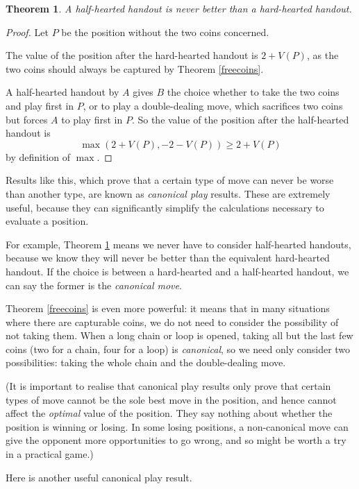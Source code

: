 \documentclass[a4paper,twocolumn]{article}
\newtheorem{halfheartedbad}[thm]{Theorem}
\begin{document}
\begin{halfheartedbad}\label{halfheartedbad}
  A half-hearted handout is never better than a hard-hearted handout.
\end{halfheartedbad}
\begin{proof}
  Let $P$ be the position without the two coins concerned.

  The value of the position after the hard-hearted handout is
  $2+V(P)$, as the two coins should always be captured by Theorem
  \ref{freecoins}.

  A half-hearted handout by $A$ gives $B$ the choice whether to take
  the two coins and play first in $P$, or to play a double-dealing
  move, which sacrifices two coins but forces $A$ to play first in
  $P$. So the value of the position after the half-hearted handout
  is $$\max(2+V(P),-2-V(P)) \ge 2+V(P)$$ by definition of $\max$.
\end{proof}

Results like this, which prove that a certain type of move can never
be worse than another type, are known as \emph{canonical play}
results. These are extremely useful, because they can significantly
simplify the calculations necessary to evaluate a position.

For example, Theorem \ref{halfheartedbad} means we never have to
consider half-hearted handouts, because we know they will never be
better than the equivalent hard-hearted handout. If the choice is
between a hard-hearted and a half-hearted handout, we can say the
former is the \emph{canonical move}.

Theorem \ref{freecoins} is even more powerful: it means that in many
situations where there are capturable coins, we do not need to
consider the possibility of not taking them. When a long chain or loop
is opened, taking all but the last few coins (two for a chain, four
for a loop) is \emph{canonical}, so we need only consider two
possibilities: taking the whole chain and the double-dealing move.

(It is important to realise that canonical play results only prove
that certain types of move cannot be the sole best move in the
position, and hence cannot affect the \emph{optimal} value of the
position. They say nothing about whether the position is winning or
losing. In some losing positions, a non-canonical move can give the
opponent more opportunities to go wrong, and so might be worth a try
in a practical game.)

Here is another useful canonical play result.
\end{document}
